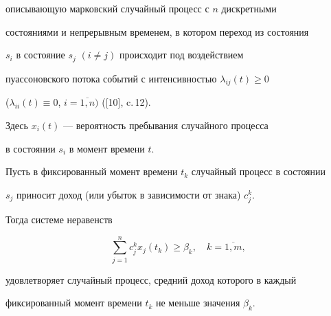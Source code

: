 описывающую марковский случайный процесс с $n$ дискретными


состояниями и непрерывным временем, в котором переход из состояния


$s_i$ в состояние $s_j$ $(i\ne j)$ происходит под воздействием


пуассоновского потока событий с интенсивностью $\lambda_{ij}(t)\ge 0$


($\lambda_{ii}(t)\equiv 0$, $i=\overline{1,n})$ ([10], c.\,12).


Здесь $x_i(t)$ --- вероятность пребывания случайного процесса


в состоянии $s_i$ в момент времени $t$.





Пусть в фиксированный момент времени $t_k$ случайный процесс в состоянии


$s_j$ приносит доход (или убыток в зависимости от знака) $c_j^k$.


Тогда системе неравенств


\begin{equation}


\sum_{j=1}^n c_j^k x_j(t_k)\ge \beta_k,\quad k=\overline{1,m}, %


\end{equation}


удовлетворяет случайный процесс, средний доход которого в каждый


фиксированный момент времени $t_k$ не меньше значения $\beta_k$.





